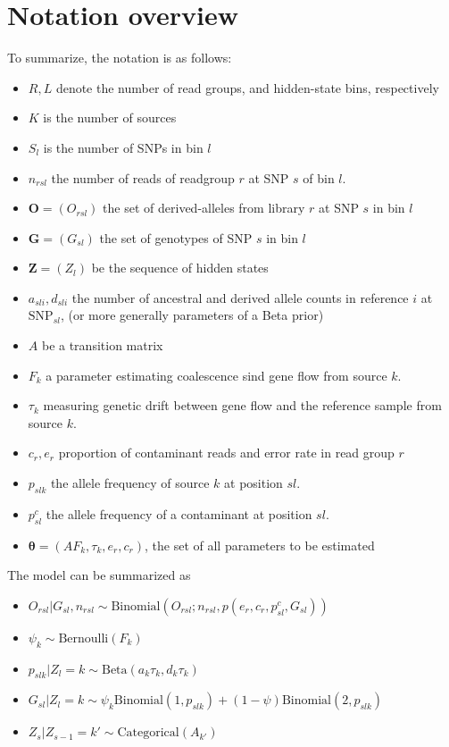 \documentclass[10pt,a4paper]{article}
\newcommand{\BFZ}{\mathbf{Z}}
\newcommand{\BFG}{\mathbf{G}}
\newcommand{\BFO}{\mathbf{O}}
\begin{document}
\section*{Notation overview}
	To summarize, the notation is as follows: 
	\begin{itemize}
		\item $R, L$ denote the number of read groups, and hidden-state bins, respectively
		\item $K$ is the number of sources 
		\item $S_l$ is the number of SNPs in bin $l$
		\item $n_{rsl}$ the number of reads of readgroup $r$ at SNP $s$ of bin $l$.
		\item $\BFO = (O_{rsl})$ the set of derived-alleles from library $r$ at SNP $s$ in bin $l$
		\item $\BFG = (G_{sl})$ the set of genotypes of SNP $s$ in bin $l$
		\item $\BFZ = (Z_l)$ be the sequence of hidden states
		\item $a_{sli}, d_{sli}$ the number of ancestral and derived allele counts in reference $i$ at $\text{SNP}_{sl}$, (or more generally parameters of a Beta prior)
		\item $A$ be a transition matrix		
		\item $F_k$ a parameter estimating coalescence sind gene flow from source $k$.
		\item $\tau_k$ measuring genetic drift between gene flow and the reference sample from source $k$.		
		\item $c_r, e_r$ proportion of contaminant reads and error rate in read group $r$
		\item $p_{slk}$ the allele frequency of source $k$ at position $sl$. 		
		\item $p_{sl}^{c}$ the allele frequency of a contaminant at position $sl$. 
		\item $\mathbf{\theta} = (A F_k, \tau_k, e_r, c_r)$, the set of all parameters to be estimated
	\end{itemize}
The model can be summarized as
	\begin{itemize}
		\item $O_{rsl} | G_{sl}, n_{rsl} \sim \text{Binomial}(O_{rsl}; n_{rsl}, p(e_r, c_r, p_{sl}^{c}, G_{sl}))$
		\item $\psi_k \sim \text{Bernoulli}(F_k)$
		\item $p_{slk} | Z_l=k \sim \text{Beta}(a_k \tau_k, d_k \tau_k)$		
		\item $G_{sl}|Z_l=k \sim \psi_k \text{Binomial}(1, p_{slk}) + (1-\psi) \text{Binomial}(2, p_{slk})$
		\item $Z_s | Z_{s-1}= k' \sim \text{Categorical}(A_{k'})$
	\end{itemize}
\end{document}

